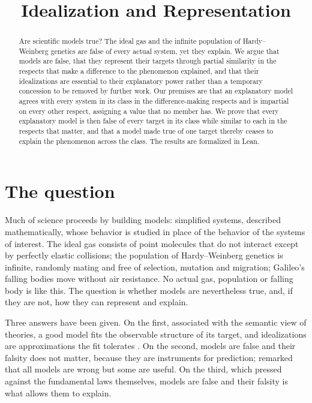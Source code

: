 \documentclass{situationist-preprint}
\title{Idealization and Representation}
\begin{document}
\maketitle

\begin{abstract}
Are scientific models true? The ideal gas and the infinite population of Hardy--Weinberg genetics are false of every actual system, yet they explain. We argue that models are false, that they represent their targets through partial similarity in the respects that make a difference to the phenomenon explained, and that their idealizations are essential to their explanatory power rather than a temporary concession to be removed by further work. Our premises are that an explanatory model agrees with every system in its class in the difference-making respects and is impartial on every other respect, assigning a value that no member has. We prove that every explanatory model is then false of every target in its class while similar to each in the respects that matter, and that a model made true of one target thereby ceases to explain the phenomenon across the class. The results are formalized in Lean.
\end{abstract}

\section{The question}

Much of science proceeds by building models: simplified systems, described mathematically, whose behavior is studied in place of the behavior of the systems of interest. The ideal gas consists of point molecules that do not interact except by perfectly elastic collisions; the population of Hardy--Weinberg genetics is infinite, randomly mating and free of selection, mutation and migration; Galileo's falling bodies move without air resistance. No actual gas, population or falling body is like this. The question is whether models are nevertheless true, and, if they are not, how they can represent and explain.

Three answers have been given. On the first, associated with the semantic view of theories, a good model fits the observable structure of its target, and idealizations are approximations the fit tolerates \citep{vanFraassen1980}. On the second, models are false and their falsity does not matter, because they are instruments for prediction; \citet{Box1976} remarked that all models are wrong but some are useful. On the third, which \citet{Cartwright1983} pressed against the fundamental laws themselves, models are false and their falsity is what allows them to explain.
\end{document}
